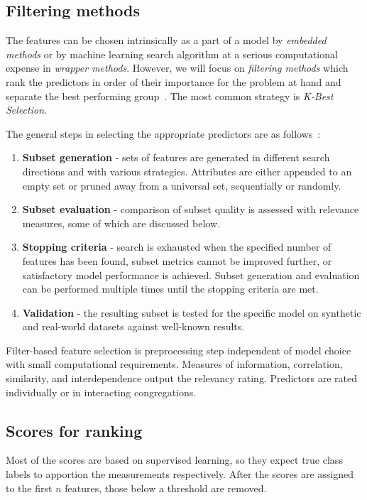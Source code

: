 \subsection{Filtering methods}
The features can be chosen intrinsically as a part of a model by \emph{embedded methods} or by machine learning search algorithm at a serious computational expense in \emph{wrapper methods}. However, we will focus on \emph{filtering methods} which rank the predictors in order of their importance for the problem at hand and separate the best performing group~\cite{johnson_feature_2019}. The most common strategy is \emph{K-Best Selection}.


The general steps in selecting the appropriate predictors are as follows~\cite{nandi_condition_2019}:

\begin{enumerate}
    \itemsep0pt
    \item \textbf{Subset generation} - sets of features are generated in different search directions and with various strategies. Attributes are either appended to an empty set or pruned away from a universal set, sequentially or randomly.
    
    \item \textbf{Subset evaluation} - comparison of subset quality is assessed with relevance measures, some of which are discussed below.

    \item \textbf{Stopping criteria} - search is exhausted when the specified number of features has been found, subset metrics cannot be improved further, or satisfactory model performance is achieved. Subset generation and evaluation can be performed multiple times until the stopping criteria are met.

    \item \textbf{Validation} - the resulting subset is tested for the specific model on synthetic and real-world datasets against well-known results. 
\end{enumerate}


Filter-based feature selection is preprocessing step independent of model choice with small computational requirements. Measures of information, correlation, similarity, and interdependence output the relevancy rating. Predictors are rated individually or in interacting congregations. 

\subsection{Scores for ranking}
Most of the scores are based on supervised learning, so they expect true class labels to apportion the measurements respectively. After the scores are assigned to the first $n$ features, those below a threshold are removed. 


